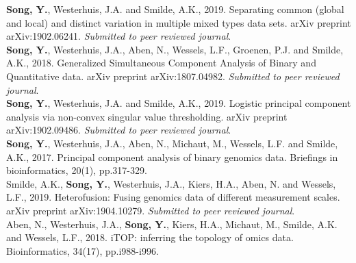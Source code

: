 \Publications

\noindent \textbf{Song, Y.}, Westerhuis, J.A. and Smilde, A.K., 2019. Separating common (global and local) and distinct variation in multiple mixed types data sets. arXiv preprint arXiv:1902.06241. \textit{Submitted to peer reviewed journal}.\\

\noindent \textbf{Song, Y.}, Westerhuis, J.A., Aben, N., Wessels, L.F., Groenen, P.J. and Smilde, A.K., 2018. Generalized Simultaneous Component Analysis of Binary and Quantitative data. arXiv preprint arXiv:1807.04982. \textit{Submitted to peer reviewed journal}.\\

\noindent \textbf{Song, Y.}, Westerhuis, J.A. and Smilde, A.K., 2019. Logistic principal component analysis via non-convex singular value thresholding. arXiv preprint arXiv:1902.09486. \textit{Submitted to peer reviewed journal}.\\

\noindent \textbf{Song, Y.}, Westerhuis, J.A., Aben, N., Michaut, M., Wessels, L.F. and Smilde, A.K., 2017. Principal component analysis of binary genomics data. Briefings in bioinformatics, 20(1), pp.317-329.\\

\noindent Smilde, A.K., \textbf{Song, Y.}, Westerhuis, J.A., Kiers, H.A., Aben, N. and Wessels, L.F., 2019. Heterofusion: Fusing genomics data of different measurement scales. arXiv preprint arXiv:1904.10279. \textit{Submitted to peer reviewed journal}.\\

\noindent Aben, N., Westerhuis, J.A., \textbf{Song, Y.}, Kiers, H.A., Michaut, M., Smilde, A.K. and  Wessels, L.F., 2018. iTOP: inferring the topology of omics data. Bioinformatics, 34(17), pp.i988-i996.\\  



